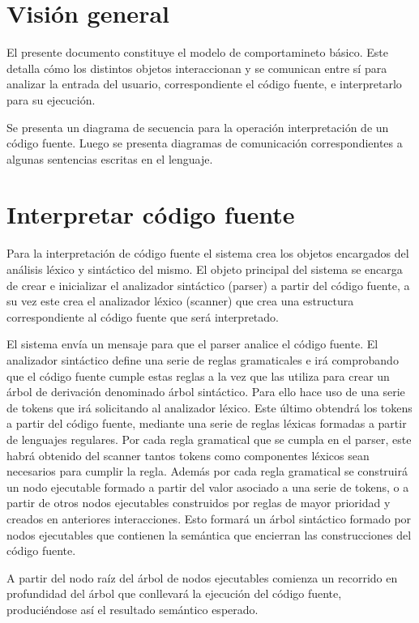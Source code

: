 \section{Visión general}
El presente documento constituye el modelo de comportamineto básico.
Este detalla cómo los distintos objetos interaccionan y se comunican entre sí para
analizar la entrada del usuario, correspondiente el código fuente, e interpretarlo
para su ejecución.

Se presenta un diagrama de secuencia para la operación interpretación
de un código fuente. Luego se presenta diagramas de comunicación correspondientes
a algunas sentencias escritas en el lenguaje.


\section{Interpretar código fuente}
Para la interpretación de código fuente el sistema crea los objetos 
encargados del análisis léxico y sintáctico del mismo. El objeto principal
del sistema se encarga de crear e inicializar el analizador sintáctico (parser) a
partir del código fuente, a su vez este crea el analizador léxico (scanner)
que crea una estructura correspondiente al código fuente que será interpretado.

El sistema envía un mensaje para que el parser analice el código fuente.
El analizador sintáctico define una serie de reglas gramaticales e irá comprobando que 
el código fuente cumple estas reglas a la vez que las utiliza para crear un árbol de derivación 
denominado árbol sintáctico. Para ello hace uso de una serie de tokens que irá solicitando 
al analizador léxico. Este último obtendrá los tokens a partir del código fuente, mediante 
una serie de reglas léxicas formadas a partir de lenguajes regulares. Por cada regla 
gramatical que se cumpla en el parser, este habrá obtenido del scanner tantos tokens como 
componentes léxicos sean necesarios para cumplir la regla. Además por cada regla gramatical se
construirá un nodo ejecutable formado a partir del valor asociado a una serie de tokens, o 
a partir de otros nodos ejecutables construidos por reglas de mayor prioridad y creados en 
anteriores interacciones. Esto formará un árbol sintáctico formado por nodos ejecutables que 
contienen la semántica que encierran las construcciones del código fuente.

A partir del nodo raíz del árbol de nodos ejecutables comienza un recorrido en profundidad del
árbol que conllevará la ejecución del código fuente, produciéndose así el resultado semántico 
esperado.

